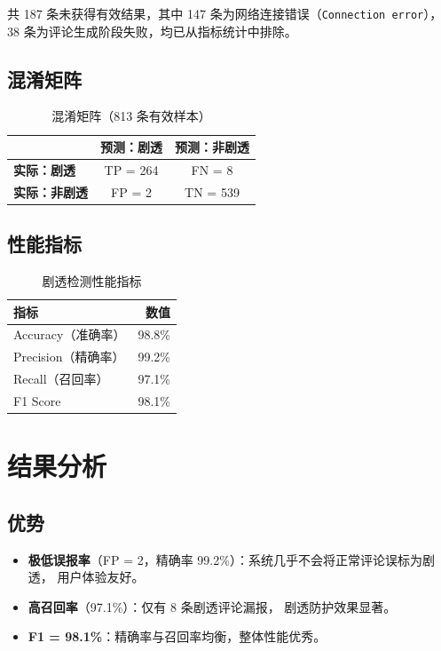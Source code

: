 \documentclass[12pt, a4paper]{article}
\begin{document}
共 187 条未获得有效结果，其中 147 条为网络连接错误（\texttt{Connection error}），
38 条为评论生成阶段失败，均已从指标统计中排除。

\subsection{混淆矩阵}

\begin{table}[h]
\centering
\begin{tabular}{lcc}
\toprule
 & \textbf{预测：剧透} & \textbf{预测：非剧透} \\
\midrule
\textbf{实际：剧透}   & TP = 264 & FN = 8 \\
\textbf{实际：非剧透} & FP = 2   & TN = 539 \\
\bottomrule
\end{tabular}
\caption{混淆矩阵（813 条有效样本）}
\end{table}

\subsection{性能指标}

\begin{table}[h]
\centering
\begin{tabular}{lr}
\toprule
\textbf{指标} & \textbf{数值} \\
\midrule
Accuracy（准确率）  & 98.8\% \\
Precision（精确率） & 99.2\% \\
Recall（召回率）    & 97.1\% \\
F1 Score            & 98.1\% \\
\bottomrule
\end{tabular}
\caption{剧透检测性能指标}
\end{table}

\section{结果分析}

\subsection{优势}

\begin{itemize}
  \item \textbf{极低误报率}（FP = 2，精确率 99.2\%）：系统几乎不会将正常评论误标为剧透，
        用户体验友好。
  \item \textbf{高召回率}（97.1\%）：仅有 8 条剧透评论漏报，
        剧透防护效果显著。
  \item \textbf{F1 = 98.1\%}：精确率与召回率均衡，整体性能优秀。
\end{itemize}
\end{document}
